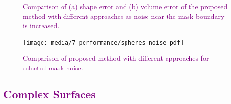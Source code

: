 \begin{figure}[h!]
	\centering
	\caption{\textcolor{purple}{Comparison of (a) shape error and (b) volume error of the proposed method with different approaches as noise near the mask boundary is increased.}}
	\label{fig:graph4}
\end{figure}
\begin{figure}[ht!]
	\centering
	\texttt{[image: media/7-performance/spheres-noise.pdf]}
	\caption{\textcolor{purple}{Comparison of proposed method with different approaches for selected mask noise.}}
	\label{fig:demos4}
\end{figure}

\color{black}
\subsection{\textcolor{purple}{Complex Surfaces}}
\label{Complex Surfaces}

